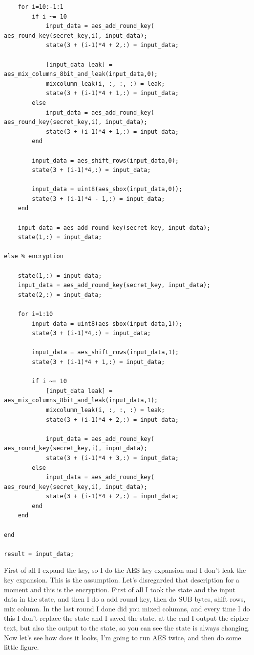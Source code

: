 \begin{verbatim}
    for i=10:-1:1
        if i ~= 10
            input_data = aes_add_round_key( aes_round_key(secret_key,i), input_data);
            state(3 + (i-1)*4 + 2,:) = input_data;

            [input_data leak] = aes_mix_columns_8bit_and_leak(input_data,0);
            mixcolumn_leak(i, :, :, :) = leak;
            state(3 + (i-1)*4 + 1,:) = input_data;
        else
            input_data = aes_add_round_key( aes_round_key(secret_key,i), input_data);
            state(3 + (i-1)*4 + 1,:) = input_data;
        end

        input_data = aes_shift_rows(input_data,0);
        state(3 + (i-1)*4,:) = input_data;

        input_data = uint8(aes_sbox(input_data,0));
        state(3 + (i-1)*4 - 1,:) = input_data;
    end

    input_data = aes_add_round_key(secret_key, input_data);
    state(1,:) = input_data;

else % encryption

    state(1,:) = input_data;
    input_data = aes_add_round_key(secret_key, input_data);
    state(2,:) = input_data;
    
    for i=1:10
        input_data = uint8(aes_sbox(input_data,1));
        state(3 + (i-1)*4,:) = input_data;

        input_data = aes_shift_rows(input_data,1);
        state(3 + (i-1)*4 + 1,:) = input_data;

        if i ~= 10
            [input_data leak] = aes_mix_columns_8bit_and_leak(input_data,1);
            mixcolumn_leak(i, :, :, :) = leak;
            state(3 + (i-1)*4 + 2,:) = input_data;

            input_data = aes_add_round_key( aes_round_key(secret_key,i), input_data);
            state(3 + (i-1)*4 + 3,:) = input_data;
        else
            input_data = aes_add_round_key( aes_round_key(secret_key,i), input_data);
            state(3 + (i-1)*4 + 2,:) = input_data;
        end
    end
            
end

result = input_data;

\end{verbatim}

First of all I expand the key, so I do the AES key expansion and I don't leak the key expansion. This is the assumption. Let's disregarded that description for a moment and this is the encryption. First of all I took the state and the input data in the state, and then I do a add round key, then do SUB bytes, shift rows, mix column. In the last round I done did you mixed columns, and every time I do this I don't replace the state and I saved the state. at the end I output the cipher text, but also the output to the state, so you can see the state is always changing. Now let's see how does it looks, I'm going to run AES twice, and then do some little figure.

